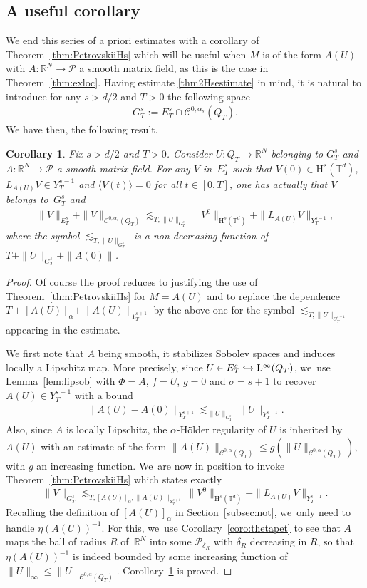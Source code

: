 \documentclass[10pt]{amsart}
\newcommand\hto{\mathrel{\lhook\joinrel\to}}
\newtheorem{coro}[prop]{Corollary}
\theoremstyle{definition}
\newcommand\R{\mathbb{R}}
\newcommand\T{\mathbb{T}}
\renewcommand\H{\mathrm{H}}
\renewcommand\L{\mathrm{L}}
\begin{document}
\subsection{A useful corollary}\label{subsec:useful}
We end this series of a priori estimates with a corollary of Theorem~\ref{thm:PetrovskiiHs} which will be useful when $M$ is of the form $A(U)$ with $A:\R^N\to\mathscr{P}$ a smooth matrix field, as this is the case in Theorem~\ref{thm:exloc}. Having estimate \eqref{thm2Hsestimate} in mind, it is natural to introduce for any $s>d/2$ and $T>0$ the following space
\begin{align}\label{def:GTs}
G_T^s:= E_T^s \cap \mathscr{C}^{0,\alpha_s}(Q_T).
\end{align} We have then, the following result.
\begin{coro}\label{coro:useful}
Fix $s>d/2$ and $T>0$. Consider $U:Q_T\to \R^N$ belonging to $G_T^{s}$ and $A:\R^N\to\mathscr{P}$ a smooth matrix field. For any $V$ in~$E_T^s$ such that $V(0)\in\H^s(\T^d)$, $L_{A(U)}V\in Y_T^{s-1}$ and $\langle V(t)\rangle=0$ for all $t\in[0,T]$, one has actually that $V$ belongs to~$G_T^s$ and
\begin{align}\label{thm2Hsestimate:useful}
\|V\|_{E_T^s} + \|V\|_{\mathscr{C}^{0,\alpha_s}(Q_T)} \lesssim_{T,\|U\|_{G_T^s}} \|V^0\|_{\H^s(\T^d)} + \|L_{A(U)}V\|_{Y_T^{s-1}},
\end{align}
where the symbol $\lesssim_{T,\|U\|_{G_T^s}}$ is a non-decreasing function of $T+\|U\|_{G_T^s}+\|A(0)\|$.
\end{coro}
\begin{proof}
Of course the proof reduces to justifying the use of Theorem~\ref{thm:PetrovskiiHs} for $M=A(U)$ and to replace the dependence $T+[A(U)]_\alpha+\|A(U)\|_{Y_T^{s+1}}$ by the above one for the symbol $\lesssim_{T,\|U\|_{G_T^{s+1}}} $ appearing in the estimate.

We first note that $A$ being smooth, it stabilizes Sobolev spaces and induces locally a Lipschitz map. More precisely, since $U\in E_T^s\hto\L^\infty(Q_T)$, we~use Lemma~\ref{lem:lipsob} with $\Phi=A$, $f=U$, $g=0$ and $\sigma=s+1$ to recover $A(U)\in Y_T^{s+1}$ with a bound
\begin{align}\label{ineq:A(U)}
\|A(U)-A(0)\|_{Y_T^{s+1}} \lesssim_{\|U\|_{G_T^s}} \|U\|_{Y_T^{s+1}}.
\end{align}
Also, since $A$ is locally Lipschitz, the $\alpha$-Hölder regularity of $U$ is inherited by $A(U)$ with an estimate of the form $\|A(U)\|_{\mathscr{C}^{0,\alpha}(Q_T)}\leq g(\|U\|_{\mathscr{C}^{0,\alpha}(Q_T)})$, with $g$ an increasing function. We~are now in position to invoke Theorem~\ref{thm:PetrovskiiHs} which states exactly
\[
\| V \|_{G_T^s} \lesssim_{T,[A(U)]_\alpha,\|A(U)\|_{Y_T^{s+1}}} \|V^0\|_{\H^s(\T^d)} + \|L_{A(U)}V\|_{Y_T^{s-1}}.
\]
Recalling the definition of $[A(U)]_\alpha$ in Section~\ref{subsec:not}, we~only need to handle $\eta(A(U))^{-1}$. For this, we~use Corollary~\ref{coro:thetapet} to see that $A$ maps the ball of radius $R$ of~$\R^N$ into some $\mathscr{P}_{\delta_R}$ with $\delta_R$ decreasing in $R$, so that $\eta(A(U))^{-1}$ is indeed bounded by some increasing function of $\|U\|_\infty\leq \|U\|_{\mathscr{C}^{0,\alpha}(Q_T)}$. Corollary~\ref{coro:useful} is proved.
\end{proof}
\end{document}

